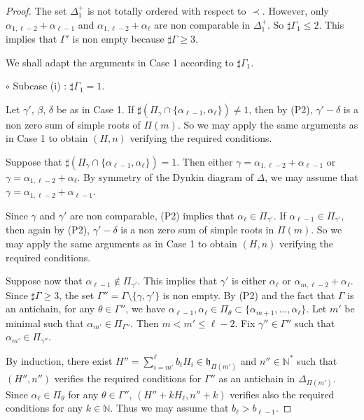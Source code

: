\documentclass[10pt,a4paper]{amsart}
\numberwithin{equation}{section}
\theoremstyle{plain}
\theoremstyle{definition}
\theoremstyle{remark}
\begin{document}
\begin{proof}
The set $\Delta_{1}^{+}$ is not totally ordered
with respect to $\prec$. However, only $\alpha_{1,\ell-2} + \alpha_{\ell-1}$ 
and $\alpha_{1,\ell-2} + \alpha_{\ell}$ are non comparable in $\Delta_{1}^{+}$. So 
$\sharp \Gamma_{1} \leqslant 2$. This implies that $\Gamma'$ is non empty
because $\sharp \Gamma\geqslant 3$.

We shall adapt the arguments in Case 1 according to $\sharp\Gamma_{1}$.
\smallskip

\noindent $\circ$ Subcase (i) : $\sharp \Gamma_{1} = 1$. 
\smallskip

Let $\gamma'$, $\beta$, $\delta$ be as in Case 1.
If $\sharp (\Pi_{\gamma}\cap \{ \alpha_{\ell-1},\alpha_{\ell}\} ) \neq 1$, then by (P2),
$\gamma'-\delta$ is a non zero sum of simple roots of $\Pi (m)$. So we may apply 
the same arguments as in Case 1 to obtain $(H,n)$ verifying the required conditions.

Suppose that $\sharp (\Pi_{\gamma}\cap \{ \alpha_{\ell-1},\alpha_{\ell}\} ) = 1$.
Then either $\gamma = \alpha_{1,\ell-2}+\alpha_{\ell-1}$ or 
$\gamma = \alpha_{1,\ell-2}+\alpha_{\ell}$. By symmetry of the Dynkin diagram of $\Delta$,  
we may assume that $\gamma = \alpha_{1,\ell-2}+\alpha_{\ell-1}$. 

Since $\gamma$ and $\gamma'$ are non comparable, (P2) implies that 
$\alpha_{\ell} \in \Pi_{\gamma'}$. If $\alpha_{\ell-1} \in \Pi_{\gamma'}$, then
again by (P2), $\gamma' - \delta$ is a non zero sum of simple roots in $\Pi (m)$. So
we may apply the same arguments as in Case 1 to obtain $(H,n)$ 
verifying the required conditions.

Suppose now that $\alpha_{\ell-1} \not\in \Pi_{\gamma'}$. This implies 
that $\gamma'$ is either $\alpha_{\ell}$ or $\alpha_{m,\ell-2} + \alpha_{\ell}$.
Since $\sharp \Gamma \geqslant 3$, the set $\Gamma'' = \Gamma \setminus 
\{ \gamma , \gamma' \}$ is non empty. By (P2) and the fact that $\Gamma$ is an antichain,
for any $\theta\in \Gamma''$, we have $\alpha_{\ell-1},\alpha_{\ell} \in  
\Pi_{\theta} \subset \{ \alpha_{m+1},\dots , \alpha_{\ell}\}$. Let $m'$ be minimal such that 
$\alpha_{m'} \in\Pi_{\Gamma''}$. Then $m < m' \leqslant \ell-2$. Fix 
$\gamma'' \in \Gamma''$ such that $\alpha_{m'} \in \Pi_{\gamma''}$.

By induction, there exist $H'' = \sum_{i=m'}^{\ell} b_{i}H_{i} \in \mathfrak{h}_{\Pi(m')}$
and $n'' \in \mathbb{N}^{*}$ such that $(H'',n'')$ verifies the required conditions for $\Gamma''$
as an antichain in $\Delta_{\Pi(m')}$. Since 
$\alpha_{\ell} \in  \Pi_{\theta}$ for any $\theta \in \Gamma''$, $(H'' + k H_{\ell} , n'' + k )$ verifies also
the required conditions for any $k\in \mathbb{N}$. Thus
we may assume that $b_{\ell} > b_{\ell-1}$.  


\end{proof}
\end{document}
